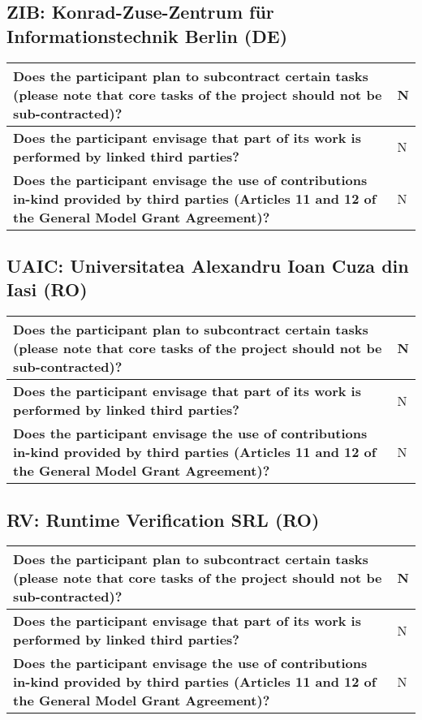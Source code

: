 \subsection{ZIB: Konrad-Zuse-Zentrum für Informationstechnik Berlin (DE)}

\begin{longtable}{|p{}|p{}|}
\hline
{\bf Does the participant plan to subcontract certain tasks (please
  note that core tasks of the project should not be sub-contracted)?}
&
N
\\
\hline
{\bf Does the participant envisage that  part of its work is performed
  by linked third parties?}
&
N
\\
\hline
{\bf Does the participant envisage the use of contributions in-kind
provided by third parties (Articles 11 and 12 of the General Model
Grant Agreement)?}
&
N
\\
\hline
\end{longtable}


\subsection{UAIC: Universitatea Alexandru Ioan Cuza din Iasi (RO)}

\begin{longtable}{|p{}|p{}|}
\hline
{\bf Does the participant plan to subcontract certain tasks (please
  note that core tasks of the project should not be sub-contracted)?}
&
N
\\
\hline
{\bf Does the participant envisage that  part of its work is performed
  by linked third parties?}
&
N
\\
\hline
{\bf Does the participant envisage the use of contributions in-kind
provided by third parties (Articles 11 and 12 of the General Model
Grant Agreement)?}
&
N
\\
\hline
\end{longtable}


\subsection{RV: Runtime Verification SRL (RO)}

\begin{longtable}{|p{}|p{}|}
\hline
{\bf Does the participant plan to subcontract certain tasks (please
  note that core tasks of the project should not be sub-contracted)?}
&
N
\\
\hline
{\bf Does the participant envisage that  part of its work is performed
  by linked third parties?}
&
N
\\
\hline
{\bf Does the participant envisage the use of contributions in-kind
provided by third parties (Articles 11 and 12 of the General Model
Grant Agreement)?}
&
N
\\
\hline
\end{longtable}










